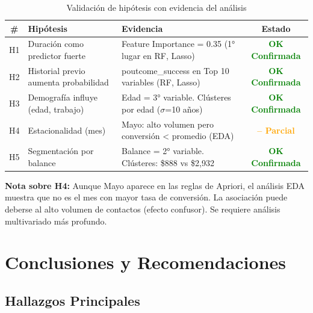 \documentclass[12pt,letterpaper]{article}
\begin{document}
\begin{table}[H]
\centering
\caption{Validación de hipótesis con evidencia del análisis}
\label{tab:validacion_hipotesis}
\small
\begin{tabular}{@{}clp{6cm}c@{}}
\toprule
\textbf{\#} & \textbf{Hipótesis} & \textbf{Evidencia} & \textbf{Estado} \\
\midrule
H1 & Duración como predictor fuerte & Feature Importance = 0.35 (1° lugar en RF, Lasso) & \textcolor{green}{\textbf{OK Confirmada}} \\
\midrule
H2 & Historial previo aumenta probabilidad & poutcome\_success en Top 10 variables (RF, Lasso) & \textcolor{green}{\textbf{OK Confirmada}} \\
\midrule
H3 & Demografía influye (edad, trabajo) & Edad = 3° variable. Clústeres por edad ($\sigma$=10 años) & \textcolor{green}{\textbf{OK Confirmada}} \\
\midrule
H4 & Estacionalidad (mes) & Mayo: alto volumen pero conversión < promedio (EDA) & \textcolor{orange}{\textbf{-- Parcial}} \\
\midrule
H5 & Segmentación por balance & Balance = 2° variable. Clústeres: \$888 vs \$2,932 & \textcolor{green}{\textbf{OK Confirmada}} \\
\bottomrule
\end{tabular}
\end{table}

\textbf{Nota sobre H4:} Aunque Mayo aparece en las reglas de Apriori, el análisis EDA muestra que no es el mes con mayor tasa de conversión. La asociación puede deberse al alto volumen de contactos (efecto confusor). Se requiere análisis multivariado más profundo.

\section{Conclusiones y Recomendaciones}

\subsection{Hallazgos Principales}
\end{document}
